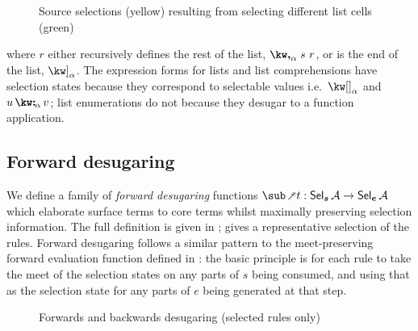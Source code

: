 \begin{figure}
   \begin{subfigure}{0.48\textwidth}
      \small
      
   \end{subfigure}
   \hfill
   \begin{subfigure}{0.48\textwidth}
      \small
      
      \end{subfigure}
   \caption{Source selections (yellow) resulting from selecting different list cells (green)}
\label{fig:surface-language:example-1}
\end{figure}

where $r$ either recursively defines the rest of the list, $\annListNext{s}{r}{\alpha}$, or is the end of the list, $\annListEnd{\alpha}$. The expression forms for lists and list comprehensions have selection states because they correspond to selectable values i.e.~$\annNil{\alpha}$ and $\annCons{u}{v}{\alpha}$; list enumerations do not because they desugar to a function application.

\subsection{Forward desugaring}

We define a family of \textit{forward desugaring} functions $\desugarFwdF{t}: \Sel{\raw{s}}{A} \to \Sel{\raw{e}}{A}$ which elaborate surface terms to core terms whilst maximally preserving selection information. The full definition is \ifappendices given in  \else \IncludedWithSupplementaryMaterial \fi;  gives a representative selection of the rules. Forward desugaring follows a similar pattern to the meet-preserving forward evaluation function defined in : the basic principle is for each rule to take the meet of the selection states on any parts of $s$ being consumed, and using that as the selection state for any parts of $e$ being generated at that step.

\begin{figure}
   
   \caption{Forwards and backwards desugaring (selected rules only)}
   \label{fig:surface-language:desugar}
\end{figure}


